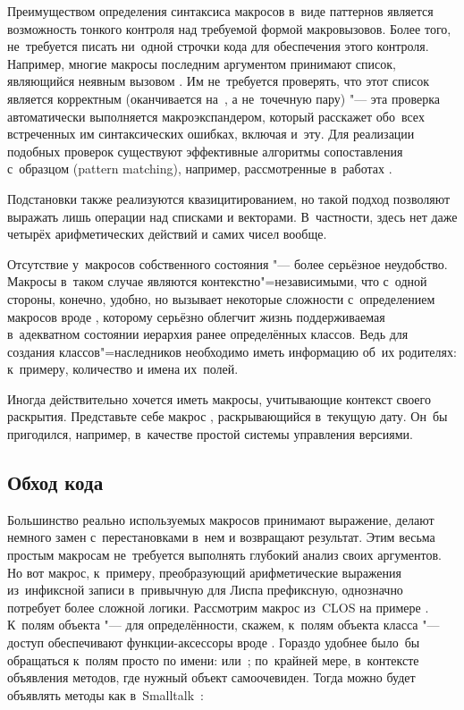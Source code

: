 Преимуществом определения синтаксиса макросов в~виде паттернов является
возможность тонкого контроля над требуемой формой макровызовов. Более того,
не~требуется писать ни~одной строчки кода для обеспечения этого контроля.
Например, многие макросы последним аргументом принимают список, являющийся
неявным вызовом . Им не~требуется проверять, что этот список
является корректным (оканчивается на~\ic{()}, а не~точечную пару) "--- эта
проверка автоматически выполняется макроэкспандером, который расскажет обо~всех
встреченных им синтаксических ошибках, включая и~эту. Для реализации подобных
проверок существуют эффективные алгоритмы сопоставления с~образцом (pattern
matching), например, рассмотренные в~работах \cite{que90b,qg92,wc94}.

Подстановки также реализуются квазицитированием, но такой подход позволяют
выражать лишь операции над списками и векторами. В~частности, здесь нет даже
четырёх арифметических действий и самих чисел вообще.

Отсутствие у~макросов собственного состояния "--- более серьёзное неудобство.
Макросы в~таком случае являются контекстно"=независимыми, что с~одной стороны,
конечно, удобно, но вызывает некоторые сложности с~определением макросов вроде
, которому серьёзно облегчит жизнь поддерживаемая в~адекватном
состоянии иерархия ранее определённых классов. Ведь для создания
классов"=наследников необходимо иметь информацию об~их родителях: к~примеру,
количество и имена их~полей.

Иногда действительно хочется иметь макросы, учитывающие контекст своего
раскрытия. Представьте себе макрос , раскрывающийся в~текущую дату.
Он~бы пригодился, например, в~качестве простой системы управления версиями.


\subsection{Обход кода}\label{macros/usage/ssect:code-walk}

Большинство реально используемых макросов принимают выражение, делают немного
замен с~перестановками в~нем и возвращают результат. Этим весьма простым
макросам не~требуется выполнять глубокий анализ своих аргументов. Но вот макрос,
к~примеру, преобразующий арифметические выражения из~инфиксной записи
в~привычную для Лиспа префиксную, однозначно потребует более сложной логики.
Рассмотрим макрос  из~CLOS на примере {\Meroonet}. К~полям
объекта "--- для определённости, скажем, к~полям объекта класса  "---
доступ обеспечивают функции-аксессоры вроде . Гораздо удобнее
было~бы обращаться к~полям просто по имени:  или~; по~крайней мере,
в~контексте объявления методов, где нужный объект самоочевиден. Тогда можно
будет объявлять методы как в~Smalltalk~\cite{gr83}:

